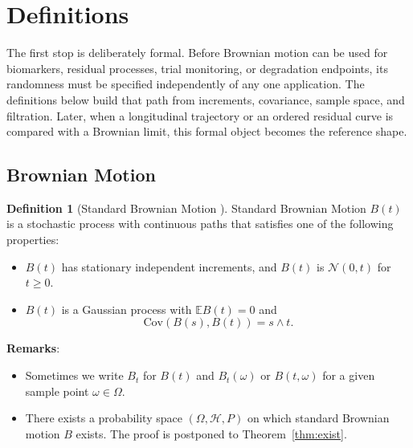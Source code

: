 \documentclass{article}
\theoremstyle{plain}
\theoremstyle{definition}
\newtheorem{definition}{Definition}
\begin{document}
\section{Definitions}

The first stop is deliberately formal. Before Brownian motion can be used
for biomarkers, residual processes, trial monitoring, or degradation
endpoints, its randomness must be specified independently of any one
application. The definitions below build that path from increments,
covariance, sample space, and filtration. Later, when a longitudinal
trajectory or an ordered residual curve is compared with a Brownian limit,
this formal object becomes the reference shape.

\subsection{Brownian Motion}
\begin{definition}[Standard Brownian Motion \citep{liggett2010continuous}]
Standard Brownian Motion $B(t)$ is a stochastic process with continuous paths that satisfies one of the following properties:
\begin{itemize}
    \item[(a)] \( B(t) \) has stationary independent increments, and \( B(t) \) is \( \mathcal{N}(0,t) \) for \( t \geq 0 \).
    \item[(b)] \( B(t) \) is a Gaussian process with \( \mathbb{E}B(t) = 0 \) and 
    \[
    \text{Cov}(B(s), B(t)) = s \wedge t.
    \]
\end{itemize}
\end{definition}

\textbf{Remarks}: 
\begin{itemize}
    \item Sometimes we write $B_t$ for $B(t)$ and $B_t(\omega)$ or $B(t,\omega)$ for a given sample point $\omega\in\Omega$.
    \item There exists a probability space $(\Omega,\mathcal{H},P)$ on which standard Brownian motion $B$ exists. The proof is postponed to Theorem~\ref{thm:exist}.
\end{itemize}
\end{document}
